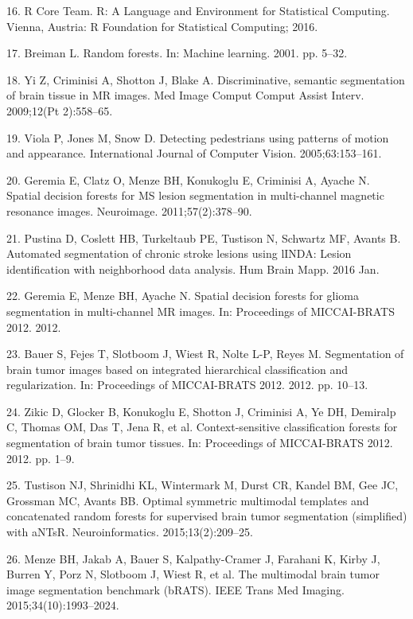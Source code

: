 \documentclass[11pt,]{article}
\begin{document}
\hypertarget{ref-R}{}
16. R Core Team. R: A Language and Environment for Statistical
Computing. Vienna, Austria: R Foundation for Statistical Computing;
2016.

\hypertarget{ref-breiman2001}{}
17. Breiman L. Random forests. In: Machine learning. 2001. pp. 5--32.

\hypertarget{ref-yi2009}{}
18. Yi Z, Criminisi A, Shotton J, Blake A. Discriminative, semantic
segmentation of brain tissue in MR images. Med Image Comput Comput
Assist Interv. 2009;12(Pt 2):558--65.

\hypertarget{ref-viola2005}{}
19. Viola P, Jones M, Snow D. Detecting pedestrians using patterns of
motion and appearance. International Journal of Computer Vision.
2005;63:153--161.

\hypertarget{ref-geremia2011}{}
20. Geremia E, Clatz O, Menze BH, Konukoglu E, Criminisi A, Ayache N.
Spatial decision forests for MS lesion segmentation in multi-channel
magnetic resonance images. Neuroimage. 2011;57(2):378--90.

\hypertarget{ref-Pustina:2016aa}{}
21. Pustina D, Coslett HB, Turkeltaub PE, Tustison N, Schwartz MF,
Avants B. Automated segmentation of chronic stroke lesions using lINDA:
Lesion identification with neighborhood data analysis. Hum Brain Mapp.
2016 Jan.

\hypertarget{ref-geremia2012}{}
22. Geremia E, Menze BH, Ayache N. Spatial decision forests for glioma
segmentation in multi-channel MR images. In: Proceedings of MICCAI-BRATS
2012. 2012.

\hypertarget{ref-bauer2012}{}
23. Bauer S, Fejes T, Slotboom J, Wiest R, Nolte L-P, Reyes M.
Segmentation of brain tumor images based on integrated hierarchical
classification and regularization. In: Proceedings of MICCAI-BRATS 2012.
2012. pp. 10--13.

\hypertarget{ref-zikic2012}{}
24. Zikic D, Glocker B, Konukoglu E, Shotton J, Criminisi A, Ye DH,
Demiralp C, Thomas OM, Das T, Jena R, et al. Context-sensitive
classification forests for segmentation of brain tumor tissues. In:
Proceedings of MICCAI-BRATS 2012. 2012. pp. 1--9.

\hypertarget{ref-Tustison:2015aa}{}
25. Tustison NJ, Shrinidhi KL, Wintermark M, Durst CR, Kandel BM, Gee
JC, Grossman MC, Avants BB. Optimal symmetric multimodal templates and
concatenated random forests for supervised brain tumor segmentation
(simplified) with aNTsR. Neuroinformatics. 2015;13(2):209--25.

\hypertarget{ref-Menze:2015aa}{}
26. Menze BH, Jakab A, Bauer S, Kalpathy-Cramer J, Farahani K, Kirby J,
Burren Y, Porz N, Slotboom J, Wiest R, et al. The multimodal brain tumor
image segmentation benchmark (bRATS). IEEE Trans Med Imaging.
2015;34(10):1993--2024.
\end{document}
